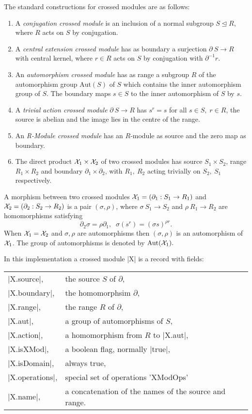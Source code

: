 The standard constructions for crossed modules are as follows:

\begin{enumerate}
\item A {\em conjugation crossed module}
      is an inclusion of a normal subgroup  $S \unlhd R$,
      where $R$ acts on $S$ by conjugation.
\item A {\em central extension crossed module} has as boundary a surjection
      $\partial \: S \to R$ with central kernel,
      where $r \in R$ acts on $S$ by conjugation with $\partial^{-1}r$.
\item An {\em automorphism crossed module} has as range a subgroup $R$
      of the automorphism group  $\mbox{Aut}(S)$  of  $S$
      which contains the inner automorphism group of $S$.
      The boundary maps $s \in S$  to the inner automorphism of $S$ by $s$.
\item A {\em trivial action crossed module}  $\partial \: S \to R$
      has  $s^r = s$  for all  $s \in S, \; r \in R$,  
      the source is abelian
      and the image lies in the centre of the range.
\item An {\em R-Module crossed module} has an $R$-module as source
      and the zero map as boundary.
\item The direct product  ${\cal X}_{1} \times {\cal X}_{2}$
      of two crossed modules has source  $S_1 \times S_2$,
      range  $R_1 \times R_2$  and boundary
      $\partial_1 \times \partial_2$,  with  $R_1,\ R_2$  acting
      trivially on  $S_2,\ S_1$  respectively.
\end{enumerate}

A morphism between two crossed modules 
${\cal X}_{1} = (\partial_1 \: S_1 \to R_1)$ and  
${\cal X}_{2} = (\partial_2 \: S_2 \to R_2)$ 
is a pair  $(\sigma, \rho)$, where 
$ \sigma \: S_1 \to S_2$ and $ \rho \: R_1 \to R_2$ 
are homomorphisms satisfying
$$
\partial_2 \sigma = \rho \partial_1, \; \;
\sigma(s^r) = (\sigma s)^{\rho r}.
$$
When ${\cal X}_{1} = {\cal X}_{2}$
and $ \sigma, \rho $ are automorphisms then 
$(\sigma, \rho)$  is an automorphism of ${\cal X}_1$. 
The group of automorphisms is denoted 
by $\mathrm{Aut}({\cal X}_1 ).$ 


In this implementation a crossed module  |X|  is a record with fields:

\begin{tabular}{ll}
|X.source|,     & the source $S$ of $\partial$,       \\
|X.boundary|,   & the homomorphsim $\partial$,        \\
|X.range|,      & the range $R$ of $\partial$,        \\
|X.aut|,        & a group of automorphisms of $S$,    \\
|X.action|,     & a homomorphism from $R$ to |X.aut|, \\
|X.isXMod|,     & a boolean flag, normally |true|,    \\
|X.isDomain|,   & always true,                        \\
|X.operations|, & special set of operations 'XModOps' \\
|X.name|,       & a concatenation of the names of the source and range.
\end{tabular}

